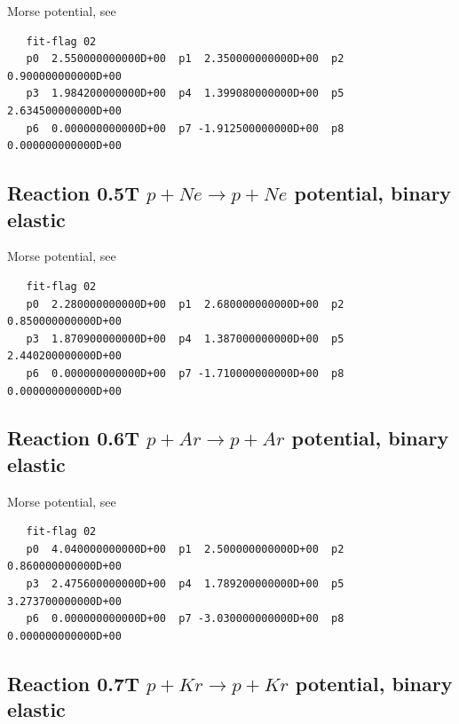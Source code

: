 \documentclass[12pt,dvipdfmx]{article}
\begin{document}
Morse potential, see \cite{kn:Bachmann}

\begin{small}\begin{verbatim}
   fit-flag 02
   p0  2.550000000000D+00  p1  2.350000000000D+00  p2  0.900000000000D+00
   p3  1.984200000000D+00  p4  1.399080000000D+00  p5  2.634500000000D+00
   p6  0.000000000000D+00  p7 -1.912500000000D+00  p8  0.000000000000D+00
\end{verbatim}\end{small}


\newpage

\subsection{
Reaction 0.5T   $ p + Ne \rightarrow p + Ne $ potential, binary elastic
}
Morse potential, see \cite{kn:Bachmann2}

\begin{small}\begin{verbatim}
   fit-flag 02
   p0  2.280000000000D+00  p1  2.680000000000D+00  p2  0.850000000000D+00
   p3  1.870900000000D+00  p4  1.387000000000D+00  p5  2.440200000000D+00
   p6  0.000000000000D+00  p7 -1.710000000000D+00  p8  0.000000000000D+00
\end{verbatim}\end{small}


\newpage

\subsection{
Reaction 0.6T   $ p + Ar \rightarrow p + Ar $ potential, binary elastic }

Morse potential, see \cite{kn:Bachmann2}

\begin{small}\begin{verbatim}
   fit-flag 02
   p0  4.040000000000D+00  p1  2.500000000000D+00  p2  0.860000000000D+00
   p3  2.475600000000D+00  p4  1.789200000000D+00  p5  3.273700000000D+00
   p6  0.000000000000D+00  p7 -3.030000000000D+00  p8  0.000000000000D+00
\end{verbatim}\end{small}


\newpage

\subsection{
Reaction 0.7T   $ p + Kr \rightarrow p + Kr $ potential, binary elastic }
\end{document}
